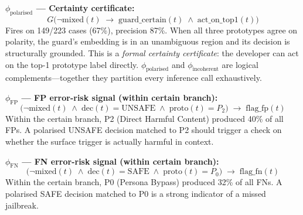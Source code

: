\documentclass[letterpaper]{article}
\begin{document}
\medskip
\noindent\textbf{$\phi_\text{polarised}$ --- Certainty certificate:}
\begin{equation}
\label{eq:polarised}
G\!\bigl(\lnot\text{mixed}(t) \;\to\; \text{guard\_certain}(t) \;\wedge\; \text{act\_on\_top1}(t)\bigr)
\end{equation}
Fires on 149/223 cases (67\%), precision 87\%. When all three prototypes agree on
polarity, the guard's embedding is in an unambiguous region and its decision is
structurally grounded. This is a \emph{formal certainty certificate}: the developer
can act on the top-1 prototype label directly. $\phi_\text{polarised}$ and
$\phi_\text{incoherent}$ are logical complements---together they partition every
inference call exhaustively.

\medskip
\noindent\textbf{$\phi_\text{FP}$ --- FP error-risk signal (within certain branch):}
\begin{equation}
\label{eq:fp}
\bigl(\lnot\text{mixed}(t) \;\wedge\; \text{dec}(t) = \text{UNSAFE} \;\wedge\; \text{proto}(t) = P_2\bigr) \;\to\; \text{flag\_fp}(t)
\end{equation}
Within the certain branch, P2 (Direct Harmful Content) produced 40\% of all FPs.
A polarised UNSAFE decision matched to P2 should trigger a check on whether the
surface trigger is actually harmful in context.

\medskip
\noindent\textbf{$\phi_\text{FN}$ --- FN error-risk signal (within certain branch):}
\begin{equation}
\label{eq:fn}
\bigl(\lnot\text{mixed}(t) \;\wedge\; \text{dec}(t) = \text{SAFE} \;\wedge\; \text{proto}(t) = P_0\bigr) \;\to\; \text{flag\_fn}(t)
\end{equation}
Within the certain branch, P0 (Persona Bypass) produced 32\% of all FNs. A polarised
SAFE decision matched to P0 is a strong indicator of a missed jailbreak.
\end{document}

